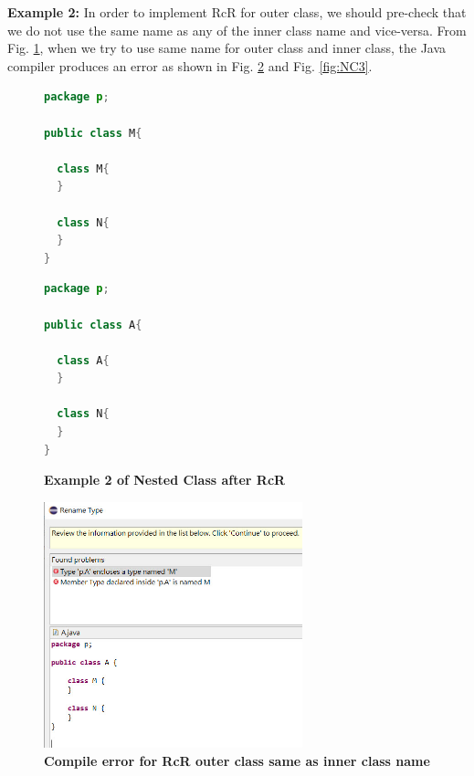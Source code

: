 \textbf{Example 2:} In order to implement RcR for outer class, we should pre-check that we do not use the same name as any of the inner class name and vice-versa. From Fig. \ref{fig:nestedclass2}, when we try to use same name for outer class and inner class, the Java compiler produces an error as shown in Fig. \ref{fig:NC2} and Fig. \ref{fig:NC3}.

\begin{figure}[th]
\centering
\begin{minipage}[t]{0.45\linewidth}
\begin{lstlisting}[language=java, basicstyle=\scriptsize\ttfamily,frame=single]
package p;

public class M{	
  
  class M{
  }
	
  class N{
  }
} 
\end{lstlisting}
\end{minipage}
\hfill
\begin{minipage}[t]{0.45\linewidth}
\begin{lstlisting}[language=java, basicstyle=\scriptsize\ttfamily,frame=single]
package p;

public class A{	
    
  class A{
  }
    
  class N{
  }
} 
\end{lstlisting}
\end{minipage}
\caption{\textbf{Example 2 of Nested Class after RcR}}
\label{fig:nestedclass2}
\end{figure}

\begin{figure}[H]
\centerline{\includegraphics[width=75mm,scale=0.4]{NC2.jpg}}
\caption{\textbf{Compile error for RcR outer class same as inner class name}}
\label{fig:NC2}
\end{figure}

